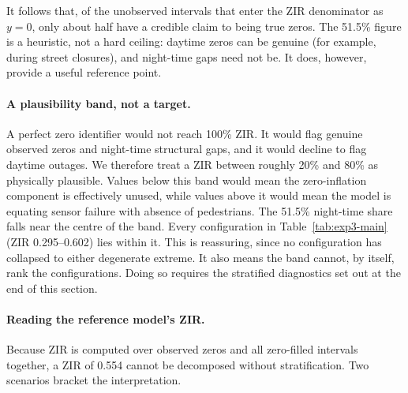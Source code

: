 It follows that, of the unobserved intervals that enter the ZIR
denominator as $y = 0$, only about half have a credible claim to being
true zeros. The 51.5\% figure is a heuristic, not a hard ceiling:
daytime zeros can be genuine (for example, during street closures), and
night-time gaps need not be. It does, however, provide a useful
reference point.

\paragraph{A plausibility band, not a target.}
A perfect zero identifier would not reach 100\% ZIR. It would flag
genuine observed zeros and night-time structural gaps, and it would
decline to flag daytime outages. We therefore treat a ZIR between
roughly 20\% and 80\% as physically plausible. Values below this band
would mean the zero-inflation component is effectively unused, while
values above it would mean the model is equating sensor failure with
absence of pedestrians. The 51.5\% night-time share falls near the
centre of the band. Every configuration in Table~\ref{tab:exp3-main}
(ZIR 0.295--0.602) lies within it. This is reassuring, since no
configuration has collapsed to either degenerate extreme. It also
means the band cannot, by itself, rank the configurations. Doing so
requires the stratified diagnostics set out at the end of this section.

\paragraph{Reading the reference model's ZIR.}
Because ZIR is computed over observed zeros and all zero-filled
intervals together, a ZIR of 0.554 cannot be decomposed without
stratification. Two scenarios bracket the interpretation.

